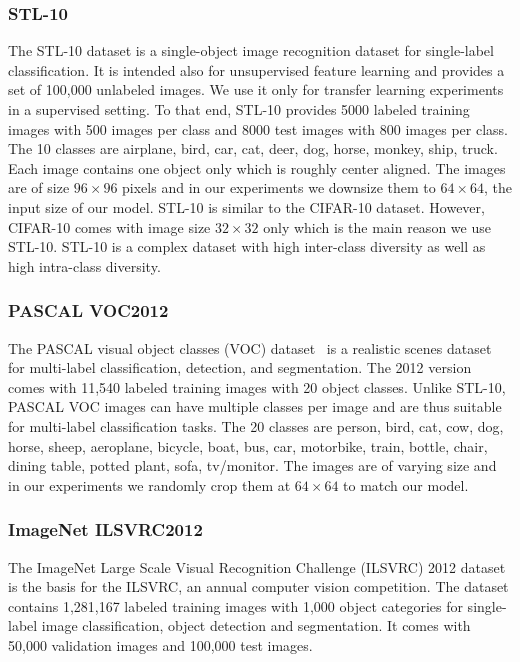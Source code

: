 \documentclass[12pt,a4paper]{article}
\begin{document}
\subsubsection{STL-10}
The STL-10 \cite{singleLayerNetworks} dataset is a single-object image recognition dataset for single-label classification. It is intended also for unsupervised feature learning and provides a set of 100,000 unlabeled images. We use it only for transfer learning experiments in a supervised setting. To that end, STL-10 provides 5000 labeled training images with 500 images per class and 8000 test images with 800 images per class. The 10 classes are airplane, bird, car, cat, deer, dog, horse, monkey, ship, truck. Each image contains one object only which is roughly center aligned. The images are of size $96 \times 96$ pixels and in our experiments we downsize them to $64 \times 64$, the input size of our model. STL-10 is similar to the CIFAR-10 dataset. However, CIFAR-10 comes with image size $32 \times 32$ only which is the main reason we use STL-10. STL-10 is a complex dataset with high inter-class diversity as well as high intra-class diversity.


\subsubsection{PASCAL VOC2012}
The PASCAL visual object classes (VOC) dataset~\cite{PascalVocDataset} is a realistic scenes dataset for multi-label classification, detection, and segmentation. The 2012 version comes with 11,540 labeled training images with 20 object classes. Unlike STL-10, PASCAL VOC images can have multiple classes per image and are thus suitable for multi-label classification tasks. The 20 classes are person, bird, cat, cow, dog, horse, sheep, aeroplane, bicycle, boat, bus, car, motorbike, train, bottle, chair, dining table, potted plant, sofa, tv/monitor. The images are of varying size and in our experiments we randomly crop them at $64 \times 64$ to match our model.


\subsubsection{ImageNet ILSVRC2012}
The ImageNet Large Scale Visual Recognition Challenge (ILSVRC) 2012 dataset \cite{ILSVRC2012} is the basis for the ILSVRC, an annual computer vision competition. The dataset contains 1,281,167 labeled training images with 1,000 object categories for single-label image classification, object detection and segmentation. It comes with 50,000 validation images and 100,000 test images. 
\end{document}

